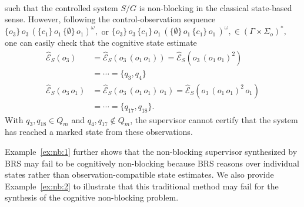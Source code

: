 \documentclass[journal,twoside,web]{ieeecolor}
\begin{document}
\begin{example}
$$\begin{aligned}
\end{aligned}
$$
such that the controlled system $S / G$ is non-blocking in the classical state-based sense.
%
However, following the control-observation sequence 
$
    \{o_3\}\,o_3\,(\{c_1\}\,o_1\,\{ \emptyset \}\,o_1)^\omega,
$
or
$
    \{o_3\}\,o_3\,\{c_1\}\,o_1\,(\{ \emptyset \}\,o_1\,\{c_1\}\,o_1\,)^\omega, \in (\Gamma \times \Sigma_o)^*,
$
one can easily check that the cognitive state estimate
$$
\begin{aligned}
    \hat{\mathcal{E}}_S(o_3) 
    &= \hat{\mathcal{E}}_S(o_3  \, (o_1 \, o_1))
     = \hat{\mathcal{E}}_S(o_3  \, (o_1 \, o_1)^2) \\
    &= \cdots = \{ q_3, q_4 \} \\
    \hat{\mathcal{E}}_S(o_3 \, o_1) 
    &= \hat{\mathcal{E}}_S(o_3 \, (o_1 \, o_1)   \, o_1)
     = \hat{\mathcal{E}}_S(o_3 \, (o_1 \, o_1)^2 \, o_1)\\
    &= \cdots = \{ q_{17}, q_{18} \}.    
\end{aligned}
$$
With $q_3,q_{18}\in Q_m$ and $q_4,q_{17}\notin Q_m$, the supervisor cannot certify that the system has reached a marked state from these observations.
\end{example}


Example~\ref{ex:nb:1} further shows that the non-blocking supervisor synthesized by BRS may fail to be cognitively non-blocking because BRS reasons over  individual states rather than observation-compatible state estimates.
%
We also provide Example~\ref{ex:nb:2} to illustrate that this traditional method may fail for the synthesis of the cognitive non-blocking problem.
\end{document}

